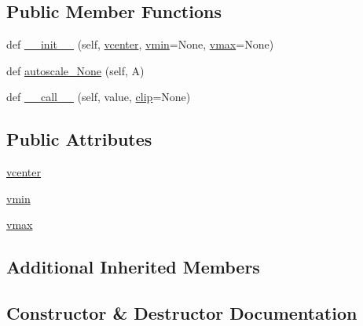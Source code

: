 \subsection*{Public Member Functions}
\begin{DoxyCompactItemize}
\item 
def \hyperlink{classmatplotlib_1_1colors_1_1TwoSlopeNorm_a7da303e009f52d4fad0ea3566d5b5514}{\+\_\+\+\_\+init\+\_\+\+\_\+} (self, \hyperlink{classmatplotlib_1_1colors_1_1TwoSlopeNorm_a2987f74afa009b4154b22beb11dab5b6}{vcenter}, \hyperlink{classmatplotlib_1_1colors_1_1TwoSlopeNorm_a1422efbdc975b322e39708bd4de4be1e}{vmin}=None, \hyperlink{classmatplotlib_1_1colors_1_1TwoSlopeNorm_ae20ae88824b1d868ed26b710ebe51794}{vmax}=None)
\item 
def \hyperlink{classmatplotlib_1_1colors_1_1TwoSlopeNorm_ab2692f06422fd0a5eeb67542fa93c1d1}{autoscale\+\_\+\+None} (self, A)
\item 
def \hyperlink{classmatplotlib_1_1colors_1_1TwoSlopeNorm_ac0907bb91e89c8af13fb1ee11361e01e}{\+\_\+\+\_\+call\+\_\+\+\_\+} (self, value, \hyperlink{classmatplotlib_1_1colors_1_1Normalize_a7355c143b0fcdd0ec9998c02e2962a8b}{clip}=None)
\end{DoxyCompactItemize}
\subsection*{Public Attributes}
\begin{DoxyCompactItemize}
\item 
\hyperlink{classmatplotlib_1_1colors_1_1TwoSlopeNorm_a2987f74afa009b4154b22beb11dab5b6}{vcenter}
\item 
\hyperlink{classmatplotlib_1_1colors_1_1TwoSlopeNorm_a1422efbdc975b322e39708bd4de4be1e}{vmin}
\item 
\hyperlink{classmatplotlib_1_1colors_1_1TwoSlopeNorm_ae20ae88824b1d868ed26b710ebe51794}{vmax}
\end{DoxyCompactItemize}
\subsection*{Additional Inherited Members}


\subsection{Constructor \& Destructor Documentation}
\mbox{\label{classmatplotlib_1_1colors_1_1TwoSlopeNorm_a7da303e009f52d4fad0ea3566d5b5514}} 
